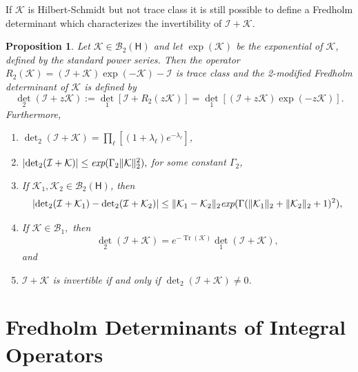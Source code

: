 \documentclass{birkjour}
\newtheorem{prop}[thm]{Proposition}
\theoremstyle{definition}
\theoremstyle{remark}
\numberwithin{equation}{section}
\newcommand{\cB}{{\mathcal B}}
\newcommand{\cI}{{\mathcal I}}
\newcommand{\cK}{{\mathcal K}}
\newcommand{\sH}{{\mathsf H}}
\begin{document}
If $\cK$ is Hilbert-Schmidt but not trace class it is still possible to define
a Fredholm determinant  which characterizes the invertibility of $\cI+\cK$.

\begin{prop}\cite[Lemma 9.1, Theorem 9.2]{Simon}\label{prop:det2}
Let $\mathcal{K} \in \cB_2(\sH)$ and let $\exp(\cK)$ be the exponential
of $\cK$, defined by the standard power series. 
Then the operator 
$ R_2(\mathcal{K}) = (\cI + \mathcal{K})\exp(-\mathcal{K}) - \cI$ is 
trace class and the 2-modified Fredholm determinant of $\cK$ is 
defined by
\begin{equation}
    {\det}_2(\mathcal{I} + z\mathcal{K}) := {\det}_1[\cI + R_2(z\mathcal{K})] =  {\det}_1[(\cI+z\mathcal{K})\exp(-z\mathcal{K})].
\end{equation}
Furthermore, 
\begin{enumerate}
    \item[(1)] ${\det}_2(\mathcal{I} + \mathcal{K}) = \prod_{\ell}\left[ (1 + \lambda_\ell) e^{-\lambda_\ell} \right]$,
    \item[(2)] $|{\det}_2(\mathcal{I} + \mathcal{K})| \leq \emph{exp}(\Gamma_2 \|\mathcal{K}\|_2^2),$ for some constant  $\Gamma_2$,
    \item[(3)] If $\cK_1,\cK_2\in \cB_2(\sH)$, then 
     \begin{equation}
     |{\det}_2(\mathcal{I} + \mathcal{K}_1) - {\det}_2(\mathcal{I} + \mathcal{K}_2)| \leq \|\mathcal{K}_1 - \mathcal{K}_2\|_2 \emph{exp}(\Gamma(\|\mathcal{K}_1\|_2 + \|\mathcal{K}_2\|_2 + 1)^2),
     \end{equation}
    \item[(4)] If $\mathcal{K} \in \cB_1,$ then \begin{equation}\label{det2exp}
{\det}_2(\mathcal{I} + \mathcal{K}) = e^{-\operatorname{Tr}(\mathcal{K})}
{\det}_1(\mathcal{I} + \mathcal{K}),
            \end{equation} 
     and 
    \item[(5)] $\mathcal{I} + \mathcal{K}$ is invertible if and only if ${\det}_2(\mathcal{I} + \mathcal{K}) \neq 0$.
\end{enumerate}
\end{prop}


\section{Fredholm Determinants of  Integral Operators}\label{sec:FredDetIntegral}
\end{document}
